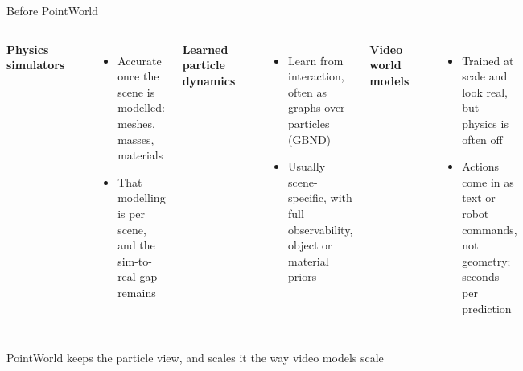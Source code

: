 \documentclass[aspectratio=169,12pt]{beamer}
\newcommand{\src}[1]{{\scriptsize\color{mute}\citep{#1}}}
\newcommand{\pw}[1]{{\color{pw}#1}}
\newcommand{\colhead}[2]{\begin{minipage}[t][1.5cm]{\linewidth}\raggedright
  {\small\bfseries #1}\\\src{#2}\end{minipage}\\}
\begin{document}
\begin{frame}{Before PointWorld}
  \begin{columns}[t]
      \colhead{Physics simulators}{todorov2012mujoco}
      \footnotesize
      \begin{itemize}
        \item Accurate once the scene is modelled: meshes, masses, materials
        \item That modelling is per scene, and the sim-to-real gap remains
      \end{itemize}
      \colhead{Learned particle dynamics}{li2018particle, ai2025review}
      \footnotesize
      \begin{itemize}
        \item Learn from interaction, often as graphs over particles (GBND)
        \item Usually scene-specific, with full observability, object or material priors
      \end{itemize}
      \colhead{Video world models}{brooks2024sora, agarwal2025cosmos, assran2025vjepa2}
      \footnotesize
      \begin{itemize}
        \item Trained at scale and look real, but physics is often off
        \item Actions come in as text or robot commands, not geometry; seconds per prediction
      \end{itemize}
  \end{columns}
  \vspace{14pt}
  \centering\footnotesize
  \pw{PointWorld keeps the particle view, and scales it the way video models scale}
\end{frame}
\end{document}
